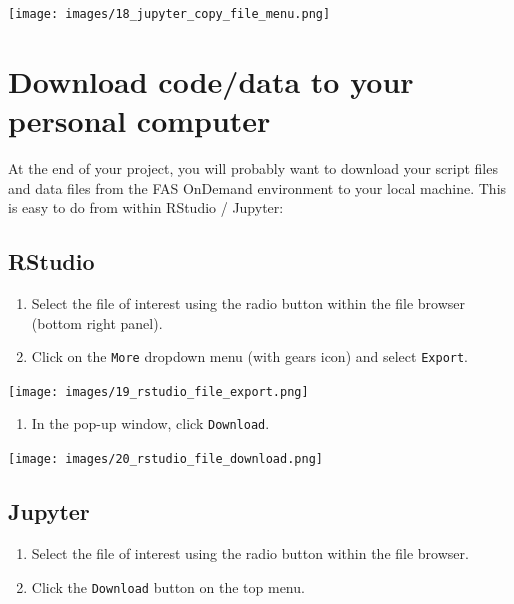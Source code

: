 \documentclass[]{book}
\providecommand{\tightlist}{%
  \setlength{\itemsep}{0pt}\setlength{\parskip}{0pt}}
\begin{document}
\texttt{[image: images/18\_jupyter\_copy\_file\_menu.png]}

\hypertarget{download-codedata-to-your-personal-computer}{%
\chapter{Download code/data to your personal computer}\label{download-codedata-to-your-personal-computer}}

At the end of your project, you will probably want to download your script files and data files from the FAS OnDemand environment to your local machine. This is easy to do from within RStudio / Jupyter:

\hypertarget{rstudio-3}{%
\section{RStudio}\label{rstudio-3}}

\begin{enumerate}
\def\labelenumi{\arabic{enumi}.}
\tightlist
\item
  Select the file of interest using the radio button within the file browser (bottom right panel).
\item
  Click on the \texttt{More} dropdown menu (with gears icon) and select \texttt{Export}.
\end{enumerate}

\texttt{[image: images/19\_rstudio\_file\_export.png]}

\begin{enumerate}
\def\labelenumi{\arabic{enumi}.}
\setcounter{enumi}{2}
\tightlist
\item
  In the pop-up window, click \texttt{Download}.
\end{enumerate}

\texttt{[image: images/20\_rstudio\_file\_download.png]}

\hypertarget{jupyter-3}{%
\section{Jupyter}\label{jupyter-3}}

\begin{enumerate}
\def\labelenumi{\arabic{enumi}.}
\tightlist
\item
  Select the file of interest using the radio button within the file browser.
\item
  Click the \texttt{Download} button on the top menu.
\end{enumerate}
\end{document}
